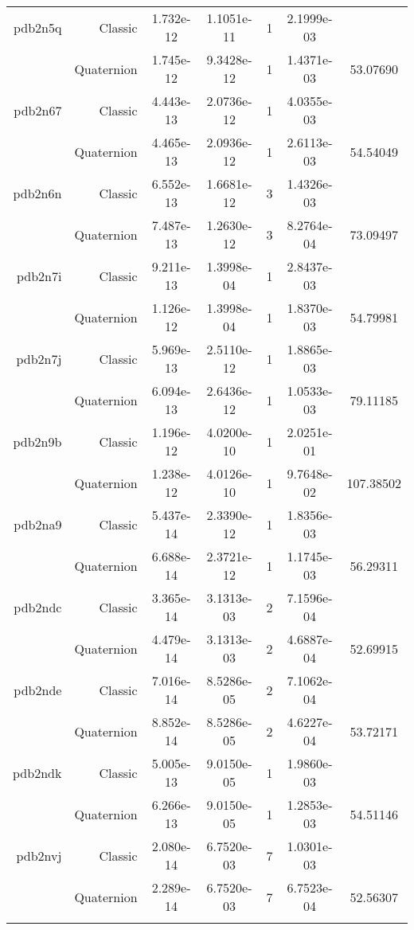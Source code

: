 \begin{xltabular}{\textwidth}{r|rS[table-format=1.3e+2]S[table-format=1.4e+2]cS[table-format=1.4e+2]S[table-format=-1.5]}
pdb2n5q & Classic & 1.732e-12 & 1.1051e-11 & 1 & 2.1999e-03 & \\
& Quaternion & 1.745e-12 & 9.3428e-12 & 1 & 1.4371e-03 & 53.07690\\  \addlinespace
pdb2n67 & Classic & 4.443e-13 & 2.0736e-12 & 1 & 4.0355e-03 & \\
& Quaternion & 4.465e-13 & 2.0936e-12 & 1 & 2.6113e-03 & 54.54049\\  \addlinespace
pdb2n6n & Classic & 6.552e-13 & 1.6681e-12 & 3 & 1.4326e-03 & \\
& Quaternion & 7.487e-13 & 1.2630e-12 & 3 & 8.2764e-04 & 73.09497\\  \addlinespace
pdb2n7i & Classic & 9.211e-13 & 1.3998e-04 & 1 & 2.8437e-03 & \\
& Quaternion & 1.126e-12 & 1.3998e-04 & 1 & 1.8370e-03 & 54.79981\\  \addlinespace
pdb2n7j & Classic & 5.969e-13 & 2.5110e-12 & 1 & 1.8865e-03 & \\
& Quaternion & 6.094e-13 & 2.6436e-12 & 1 & 1.0533e-03 & 79.11185\\  \addlinespace
pdb2n9b & Classic & 1.196e-12 & 4.0200e-10 & 1 & 2.0251e-01 & \\
& Quaternion & 1.238e-12 & 4.0126e-10 & 1 & 9.7648e-02 & 107.38502\\  \addlinespace
pdb2na9 & Classic & 5.437e-14 & 2.3390e-12 & 1 & 1.8356e-03 & \\
& Quaternion & 6.688e-14 & 2.3721e-12 & 1 & 1.1745e-03 & 56.29311\\  \addlinespace
pdb2ndc & Classic & 3.365e-14 & 3.1313e-03 & 2 & 7.1596e-04 & \\
& Quaternion & 4.479e-14 & 3.1313e-03 & 2 & 4.6887e-04 & 52.69915\\  \addlinespace
pdb2nde & Classic & 7.016e-14 & 8.5286e-05 & 2 & 7.1062e-04 & \\
& Quaternion & 8.852e-14 & 8.5286e-05 & 2 & 4.6227e-04 & 53.72171\\  \addlinespace
pdb2ndk & Classic & 5.005e-13 & 9.0150e-05 & 1 & 1.9860e-03 & \\
& Quaternion & 6.266e-13 & 9.0150e-05 & 1 & 1.2853e-03 & 54.51146\\  \addlinespace
pdb2nvj & Classic & 2.080e-14 & 6.7520e-03 & 7 & 1.0301e-03 & \\
& Quaternion & 2.289e-14 & 6.7520e-03 & 7 & 6.7523e-04 & 52.56307\\  \addlinespace

\end{xltabular}

